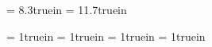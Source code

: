 

\paperwidth = 8.3truein
\paperheight = 11.7truein

\topmargin = 1truein
\bottommargin = 1truein
\rightmargin = 1truein
\leftmargin = 1truein

\def\solinput#1{
  \bigskip{}
  \leftline{{\bf #1}}
  \bigskip{}
  
}

